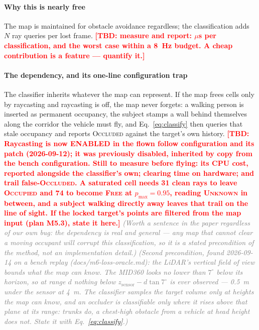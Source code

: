 \documentclass[conference]{IEEEtran}
\newcommand{\tbd}[1]{\textcolor{red}{\textbf{[TBD: #1]}}}
\newcommand{\note}[1]{\textcolor{gray}{\textit{(#1)}}}
\newcommand{\occluded}{\textsc{Occluded}}
\begin{document}
\paragraph{Why this is nearly free} The map is maintained for obstacle avoidance
regardless; the classification adds $N$ ray queries per lost frame.
\tbd{measure and report: $\mu$s per classification, and the worst case within a
\SI{8}{\hertz} budget. A cheap contribution is a feature --- quantify it.}

\paragraph{The dependency, and its one-line configuration trap}
The classifier inherits whatever the map can represent. If the map frees cells
only by raycasting and raycasting is off, the map never forgets: a walking person
is inserted as permanent occupancy, the subject stamps a wall behind themselves
along the corridor the vehicle must fly, and Eq.~\eqref{eq:classify} then queries
that stale occupancy and reports \occluded{} against the target's own history.
\tbd{Raycasting is now ENABLED in the flown follow configuration and its patch
(2026-09-12); it was previously disabled, inherited by copy from the bench
configuration. Still to measure before flying: its CPU cost, reported alongside
the classifier's own; clearing time on hardware; and trail false-\occluded{}. A
saturated cell needs 31 clean rays to leave \textsc{Occupied} and 74 to become
\textsc{Free} at $p_{\max}=0.95$, reading \textsc{Unknown} in between, and a subject
walking directly away leaves that trail on the line of sight. If the locked
target's points are filtered from the map input (plan M5.3), state it here.}
\note{Worth a sentence in the paper regardless of our own bug: the dependency is
real and general --- any map that cannot clear a moving occupant will corrupt this
classification, so it is a stated precondition of the method, not an
implementation detail.}
\note{Second precondition, found 2026-09-14 on a bench replay (docs/m6-loss-oracle.md): the
LiDAR's vertical field of view bounds what the map can know. The MID360 looks no lower than
$7^\circ$ below its horizon, so at range $d$ nothing below $z_{\text{sensor}} - d\tan 7^\circ$
is ever observed --- \SI{0.5}{\meter} under the sensor at \SI{4}{\meter}. The classifier
samples the target volume only at heights the map can know, and an occluder is classifiable
only where it rises above that plane at its range: trunks do, a chest-high obstacle from a
vehicle at head height does not. State it with Eq.~\eqref{eq:classify}.}
\end{document}
